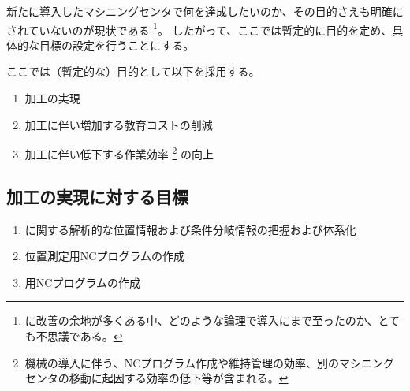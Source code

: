 

新たに導入したマシニングセンタで何を達成したいのか、その目的さえも明確にされていないのが現状である
\footnote{\MMC に改善の余地が多くある中、どのような論理で導入にまで至ったのか、とても不思議である。}。
したがって、ここでは暫定的に目的を定め、具体的な目標の設定を行うことにする。



ここでは（暫定的な）目的として以下を採用する。
\begin{enumerate}[label=\sarrow]
\item \Dimple 加工の実現
\item \Dimple 加工に伴い増加する教育コストの削減
\item \Dimple 加工に伴い低下する作業効率%
\footnote{機械の導入に伴う、NCプログラム作成や維持管理の効率、別のマシニングセンタの移動に起因する効率の低下等が含まれる。}
の向上
\end{enumerate}





\subsection{\Dimple 加工の実現に対する目標}
\begin{enumerate}[label=\sarrow]
\item \Dimple に関する解析的な位置情報および条件分岐情報の把握および体系化
\item \Dimple 位置測定用NCプログラムの作成
\item \DimpleMilling 用NCプログラムの作成
\end{enumerate}


